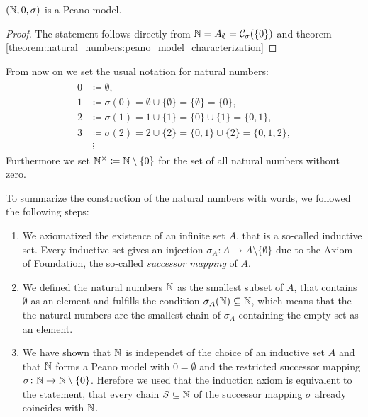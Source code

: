 \begin{theorem}\label{theorem:natural_numbers:peano_model_existence} $(\mathbb{N},0,\sigma)$ is a Peano model.
\end{theorem}

\begin{proof}
    The statement follows directly from $\mathbb{N}={A}_\emptyset=\mathcal C_{\sigma}(\{0\})$ and theorem \ref{theorem:natural_numbers:peano_model_characterization}
\end{proof}

From now on we set the usual notation for natural numbers:
\begin{align}\label{eq:natural_numbers:representation}\begin{split}
    0&\coloneq\emptyset,\\
    1&\coloneq\sigma(0)=\emptyset\cup\{\emptyset\}=\{\emptyset\}=\{0\},\\
    2&\coloneq\sigma(1)=1\cup\{1\}=\{0\}\cup\{1\}=\{0,1\},\\
    3&\coloneq\sigma(2)=2\cup\{2\}=\{0,1\}\cup\{2\}=\{0,1,2\},\\
    &\ \vdots
\end{split}\end{align}
Furthermore we set $\mathbb{N}^\times\coloneq\mathbb{N}\setminus\{0\}$ for the set of all natural numbers without zero.

To summarize the construction of the natural numbers with words, we followed the following steps:
\begin{enumerate}
    \item We axiomatized the existence of an infinite set $A$, that is a so-called inductive set. Every inductive set gives an injection $\sigma_A\colon A\to A\setminus\{\emptyset\}$ due to the Axiom of Foundation, the so-called \emph{successor mapping} of $A$.
    \item We defined the natural numbers $\mathbb{N}$ as the smallest subset of $A$, that contains $\emptyset$ as an element and fulfills the condition $\sigma_A(\mathbb{N})\subseteq\mathbb{N}$, which means that the the natural numbers are the smallest chain of $\sigma_A$ containing the empty set as an element.
    \item We have shown that $\mathbb{N}$ is independet of the choice of an inductive set $A$ and that $\mathbb{N}$ forms a Peano model with $0=\emptyset$ and the restricted successor mapping $\sigma\colon\mathbb{N}\to\mathbb{N}\setminus\{0\}$. Herefore we used that the induction axiom is equivalent to the statement, that every chain $S\subseteq\mathbb{N}$ of the successor mapping $\sigma$ already coincides with $\mathbb{N}$.
\end{enumerate}

